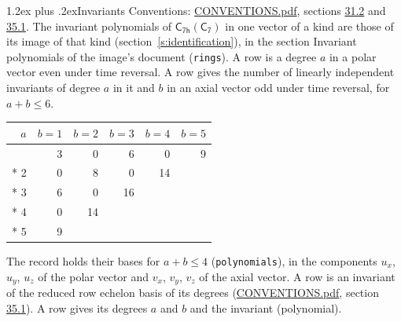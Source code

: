 \documentclass[10pt,a4paper]{article}
\makeatletter
\renewcommand\section{\@startsection{section}{1}{\z@}{-3ex plus -1ex minus -.2ex}%
  {1.2ex plus .2ex}{\normalfont\large\sffamily\bfseries\color{parttitle}}}
\numberwithin{equation}{section}
\newcommand{\grp}[1]{\mathsf{#1}}
\makeatother
\begin{document}
\section{Invariants}\label{s:invariants}
Conventions: \href{../../CONVENTIONS.pdf}{CONVENTIONS.pdf}, sections \href{../../CONVENTIONS.pdf\#conv.31.2}{31.2} and \href{../../CONVENTIONS.pdf\#conv.35.1}{35.1}.
The invariant polynomials of $\grp{C_{7h}}(\grp{C_{7}})$ in one vector of a kind are those of its image of that kind (section~\ref{s:identification}), in the section Invariant polynomials of the image's document (\texttt{rings}).
\leavevmode\label{n:index.degree.polar}\label{n:index.degree.axial}A row is a degree $a$ in a polar vector even under time reversal. A row gives the number of linearly independent invariants of degree $a$ in it and $b$ in an axial vector odd under time reversal, for $a + b \le 6$.
{\small\begin{longtable}{@{}rrrrrr@{}}\toprule
$a$ & $b = 1$ & $b = 2$ & $b = 3$ & $b = 4$ & $b = 5$\\\midrule\endhead
\bottomrule\endfoot\endlastfoot
1 & 3 & 0 & 6 & 0 & 9\\*
2 & 0 & 8 & 0 & 14 & \\*
3 & 6 & 0 & 16 &  & \\*
4 & 0 & 14 &  &  & \\*
5 & 9 &  &  &  & \\
\bottomrule\end{longtable}}
\leavevmode\label{n:local.component.polar}\label{n:local.component.axial}The record holds their bases for $a + b \le 4$ (\texttt{polynomials}), in the components $u_{x}$, $u_{y}$, $u_{z}$ of the polar vector and $v_{x}$, $v_{y}$, $v_{z}$ of the axial vector. \label{n:head.polynomial}A row is an invariant of the reduced row echelon basis of its degrees (\href{../../CONVENTIONS.pdf}{CONVENTIONS.pdf}, section \href{../../CONVENTIONS.pdf\#conv.35.1}{35.1}). A row gives its degrees $a$ and $b$ and the invariant (polynomial).
\end{document}
